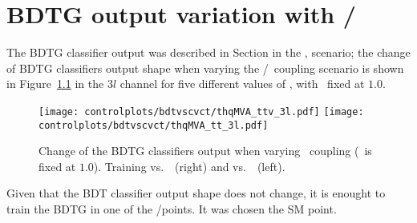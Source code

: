 \chapter{BDTG output variation with \CV/\Ct }\label{sec:bdtvscvct}

The BDTG classifier output was described in Section \label{secc:signal_disc} in the , scenario; the change of BDTG classifiers output shape when varying the \CV/\Ct\ coupling scenario is shown in Figure~\ref{fig:bdtvscvct} in the $3l$ channel for five different values of \Ct, with \CV\ fixed at $1.0$.
\begin{figure} [!h]
  \centering
  \texttt{[image: controlplots/bdtvscvct/thqMVA\_ttv\_3l.pdf]}
  \texttt{[image: controlplots/bdtvscvct/thqMVA\_tt\_3l.pdf]} \\
  \caption[BDTG output variation with \CV/\Ct]{Change of the BDTG classifiers output when varying \Ct\ coupling (\CV\ is fixed at $1.0$). Training vs.\ \ttV\ (right) and vs.\ \ttbar\ (left).}
  \label{fig:bdtvscvct}
\end{figure}

Given that the BDT classifier output shape does not change, it is enought to train the BDTG in one of the \Ct/\CV points. It was chosen the SM point.  

